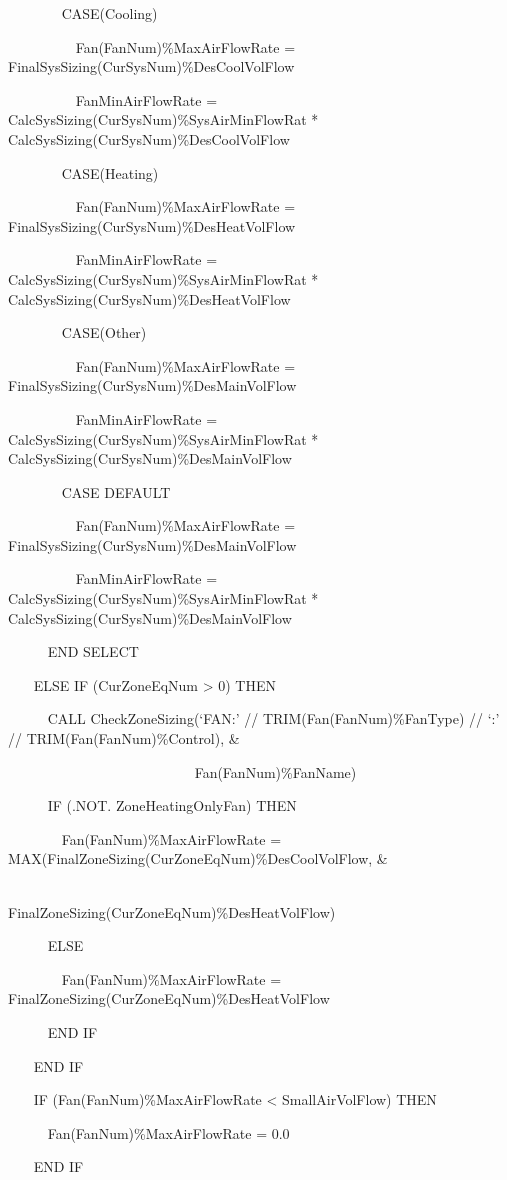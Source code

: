 ~~~~~~~ CASE(Cooling)

~~~~~~~~~ Fan(FanNum)\%MaxAirFlowRate = FinalSysSizing(CurSysNum)\%DesCoolVolFlow

~~~~~~~~~ FanMinAirFlowRate = CalcSysSizing(CurSysNum)\%SysAirMinFlowRat * CalcSysSizing(CurSysNum)\%DesCoolVolFlow

~~~~~~~ CASE(Heating)

~~~~~~~~~ Fan(FanNum)\%MaxAirFlowRate = FinalSysSizing(CurSysNum)\%DesHeatVolFlow

~~~~~~~~~ FanMinAirFlowRate = CalcSysSizing(CurSysNum)\%SysAirMinFlowRat * CalcSysSizing(CurSysNum)\%DesHeatVolFlow

~~~~~~~ CASE(Other)

~~~~~~~~~ Fan(FanNum)\%MaxAirFlowRate = FinalSysSizing(CurSysNum)\%DesMainVolFlow

~~~~~~~~~ FanMinAirFlowRate = CalcSysSizing(CurSysNum)\%SysAirMinFlowRat * CalcSysSizing(CurSysNum)\%DesMainVolFlow

~~~~~~~ CASE DEFAULT

~~~~~~~~~ Fan(FanNum)\%MaxAirFlowRate = FinalSysSizing(CurSysNum)\%DesMainVolFlow

~~~~~~~~~ FanMinAirFlowRate = CalcSysSizing(CurSysNum)\%SysAirMinFlowRat * CalcSysSizing(CurSysNum)\%DesMainVolFlow

~~~~~ END SELECT

~~~ ELSE IF (CurZoneEqNum \textgreater{} 0) THEN

~~~~~ CALL CheckZoneSizing(`FAN:' // TRIM(Fan(FanNum)\%FanType) // `:' // TRIM(Fan(FanNum)\%Control), \&

~~~~~~~~~~~~~~~~~~~~~~~~~~ Fan(FanNum)\%FanName)

~~~~~ IF (.NOT. ZoneHeatingOnlyFan) THEN

~~~~~~~ Fan(FanNum)\%MaxAirFlowRate = MAX(FinalZoneSizing(CurZoneEqNum)\%DesCoolVolFlow, \&

~~~~~~~~~~~~~~~~~~~~~~~~~~~~~~~~~~~~~~~~ FinalZoneSizing(CurZoneEqNum)\%DesHeatVolFlow)

~~~~~ ELSE

~~~~~~~ Fan(FanNum)\%MaxAirFlowRate = FinalZoneSizing(CurZoneEqNum)\%DesHeatVolFlow

~~~~~ END IF

~~~ END IF

~~~ IF (Fan(FanNum)\%MaxAirFlowRate \textless{} SmallAirVolFlow) THEN

~~~~~ Fan(FanNum)\%MaxAirFlowRate = 0.0

~~~ END IF

